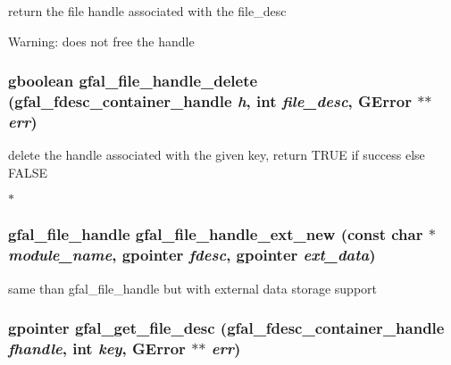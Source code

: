 return the file handle associated with the file\_\-desc \begin{Desc}
\item[Warning:]does not free the handle \end{Desc}
\subsubsection{\setlength{\rightskip}{0pt plus 5cm}gboolean gfal\_\-file\_\-handle\_\-delete (gfal\_\-fdesc\_\-container\_\-handle {\em h}, int {\em file\_\-desc}, GError $\ast$$\ast$ {\em err})}\label{gfal__common__filedescriptor_8c_5434be84154718254a4e90dbcc196359}


delete the handle associated with the given key, return TRUE if success else FALSE

$\ast$ 
\subsubsection{\setlength{\rightskip}{0pt plus 5cm}gfal\_\-file\_\-handle gfal\_\-file\_\-handle\_\-ext\_\-new (const char $\ast$ {\em module\_\-name}, gpointer {\em fdesc}, gpointer {\em ext\_\-data})}\label{gfal__common__filedescriptor_8c_a55408b4cba00997f0c034d5aeffa641}


same than gfal\_\-file\_\-handle but with external data storage support 
\subsubsection{\setlength{\rightskip}{0pt plus 5cm}gpointer gfal\_\-get\_\-file\_\-desc (gfal\_\-fdesc\_\-container\_\-handle {\em fhandle}, int {\em key}, GError $\ast$$\ast$ {\em err})}\label{gfal__common__filedescriptor_8c_91568ee8206643b36d685269b012eb45}


